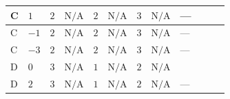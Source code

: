 \documentclass[8pt]{article}
\begin{document}
\begin{landscape}
\begin{longtable}{@{}llcccccc >{\raggedright\arraybackslash}p{0.21\linewidth} >{\raggedright\arraybackslash}p{0.21\linewidth} >{\raggedright\arraybackslash}p{0.21\linewidth}@{}}
\midrule
C & $1$ & $2$ & $\text{N/A}$ & $2$ & $\text{N/A}$ & $3$ & $\text{N/A}$ & --- & \scriptsize\adjustbox{max width=\linewidth}{$\begin{gathered} -9 {g_2}^2 {\lambda_{12}^{(1)}}\end{gathered}$} & \scriptsize\adjustbox{max width=\linewidth}{$\begin{gathered} -15 {g_1}^2 {\lambda_{12}^{(1)}}\end{gathered}$} \\
\midrule
C & $-1$ & $2$ & $\text{N/A}$ & $2$ & $\text{N/A}$ & $3$ & $\text{N/A}$ & --- & \scriptsize\adjustbox{max width=\linewidth}{$\begin{gathered} -9 {g_2}^2 {\lambda_{12}^{(1)}}\end{gathered}$} & \scriptsize\adjustbox{max width=\linewidth}{$\begin{gathered} -3 {g_1}^2 {\lambda_{12}^{(1)}}\end{gathered}$} \\
\midrule
C & $-3$ & $2$ & $\text{N/A}$ & $2$ & $\text{N/A}$ & $3$ & $\text{N/A}$ & --- & \scriptsize\adjustbox{max width=\linewidth}{$\begin{gathered} -9 {g_2}^2 {\lambda_{12}^{(1)}}\end{gathered}$} & \scriptsize\adjustbox{max width=\linewidth}{$\begin{gathered} -15 {g_1}^2 {\lambda_{12}^{(1)}}\end{gathered}$} \\
\midrule
D & $0$ & $3$ & $\text{N/A}$ & $1$ & $\text{N/A}$ & $2$ & $\text{N/A}$ & \scriptsize\adjustbox{max width=\linewidth}{$\begin{gathered} +4 {\lambda_{X_{14}}} \left({\lambda_{X_{14}}}\right)^{*}\end{gathered}$} & \scriptsize\adjustbox{max width=\linewidth}{$\begin{gathered} -12 {g_2}^2 {\lambda_{12}^{(1)}}\end{gathered}$} & \scriptsize\adjustbox{max width=\linewidth}{$\begin{gathered} -6 {g_1}^2 {\lambda_{12}^{(1)}}\end{gathered}$} \\
\midrule
D & $2$ & $3$ & $\text{N/A}$ & $1$ & $\text{N/A}$ & $2$ & $\text{N/A}$ & --- & \scriptsize\adjustbox{max width=\linewidth}{$\begin{gathered} -12 {g_2}^2 {\lambda_{12}^{(1)}}\end{gathered}$} & \scriptsize\adjustbox{max width=\linewidth}{$\begin{gathered} -30 {g_1}^2 {\lambda_{12}^{(1)}}\end{gathered}$} \\

\end{longtable}
\end{landscape}
\end{document}
